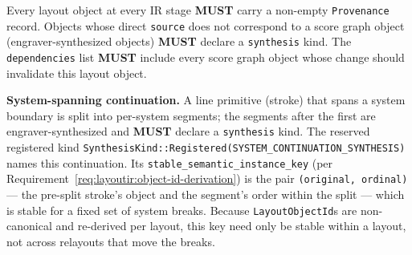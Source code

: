 \documentclass[11pt,letterpaper]{report}
\newcounter{requirement}[chapter]
\newcommand{\MUST}{\textbf{MUST}}
\begin{document}
\begin{requirement}
  \label{req:layoutir:provenance-completeness}
  Every layout object at every IR stage \MUST{} carry a non-empty
  \texttt{Provenance} record. Objects whose direct \texttt{source}
  does not correspond to a score graph object (engraver-synthesized
  objects) \MUST{} declare a \texttt{synthesis} kind. The
  \texttt{dependencies} list \MUST{} include every score graph object
  whose change should invalidate this layout object.
\end{requirement}

\begin{requirement}
  \label{req:layoutir:continuation-synthesis}
  \textbf{System-spanning continuation.} A line primitive (stroke) that spans a
  system boundary is split into per-system segments; the segments after the
  first are engraver-synthesized and \MUST{} declare a \texttt{synthesis} kind.
  The reserved registered kind
  \texttt{SynthesisKind::Registered(SYSTEM\_CONTINUATION\_SYNTHESIS)} names this
  continuation. Its \texttt{stable\_semantic\_instance\_key} (per
  Requirement~\ref{req:layoutir:object-id-derivation}) is the pair
  \texttt{(original,\,ordinal)} --- the pre-split stroke's object and the
  segment's order within the split --- which is stable for a fixed set of system
  breaks. Because \texttt{LayoutObjectId}s are non-canonical and re-derived per
  layout, this key need only be stable within a layout, not across relayouts
  that move the breaks.
\end{requirement}
\end{document}
